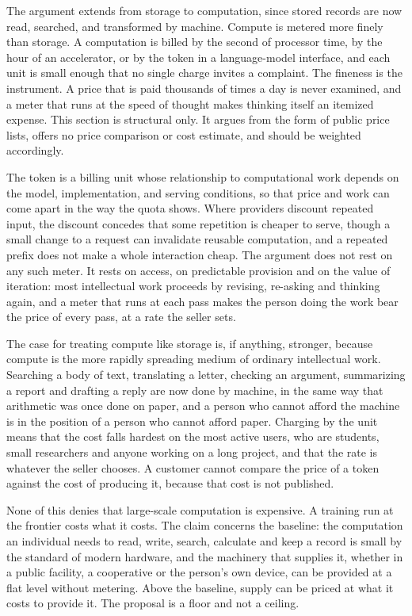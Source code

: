 \documentclass[12pt]{article}
\begin{document}
The argument extends from storage to computation, since stored records are now read, searched, and transformed by machine. Compute is metered more finely than storage. A computation is billed by the second of processor time, by the hour of an accelerator, or by the token in a language-model interface, and each unit is small enough that no single charge invites a complaint. The fineness is the instrument. A price that is paid thousands of times a day is never examined, and a meter that runs at the speed of thought makes thinking itself an itemized expense. This section is structural only. It argues from the form of public price lists, offers no price comparison or cost estimate, and should be weighted accordingly.

The token is a billing unit whose relationship to computational work depends on the model, implementation, and serving conditions, so that price and work can come apart in the way the quota shows. Where providers discount repeated input, the discount concedes that some repetition is cheaper to serve, though a small change to a request can invalidate reusable computation, and a repeated prefix does not make a whole interaction cheap. The argument does not rest on any such meter. It rests on access, on predictable provision and on the value of iteration: most intellectual work proceeds by revising, re-asking and thinking again, and a meter that runs at each pass makes the person doing the work bear the price of every pass, at a rate the seller sets.

The case for treating compute like storage is, if anything, stronger, because compute is the more rapidly spreading medium of ordinary intellectual work. Searching a body of text, translating a letter, checking an argument, summarizing a report and drafting a reply are now done by machine, in the same way that arithmetic was once done on paper, and a person who cannot afford the machine is in the position of a person who cannot afford paper. Charging by the unit means that the cost falls hardest on the most active users, who are students, small researchers and anyone working on a long project, and that the rate is whatever the seller chooses. A customer cannot compare the price of a token against the cost of producing it, because that cost is not published.

None of this denies that large-scale computation is expensive. A training run at the frontier costs what it costs. The claim concerns the baseline: the computation an individual needs to read, write, search, calculate and keep a record is small by the standard of modern hardware, and the machinery that supplies it, whether in a public facility, a cooperative or the person's own device, can be provided at a flat level without metering. Above the baseline, supply can be priced at what it costs to provide it. The proposal is a floor and not a ceiling.
\end{document}
